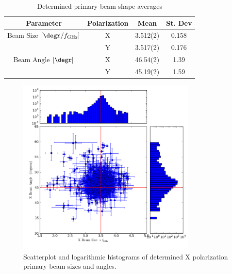 \documentclass[preprint]{aastex}
\begin{document}
\begin{table}[htb]
\begin{center}
\begin{tabular}{cccc}
Parameter & Polarization & Mean & St. Dev \\
\hline
Beam Size $[\degr / f_\textrm{GHz}]$ & X & 3.512(2) & 0.158 \\
                                                             & Y & 3.517(2) & 0.176 \\ \hline
Beam Angle $[\degr]$ & X & 46.54(2) & 1.39 \\
                                     & Y & 45.19(2) & 1.59
\end{tabular}
\caption{Determined primary beam shape averages \label{tab.beamshape}}
\end{center}
\end{table}

\begin{figure}[htb]
\begin{center}
\includegraphics[width=0.8\textwidth]{images/x_magangle}
\caption{Scatterplot and logarithmic histograms of determined X polarization primary beam sizes and angles. \label{fig.x_shape}}
\end{center}
\end{figure}
\end{document}
